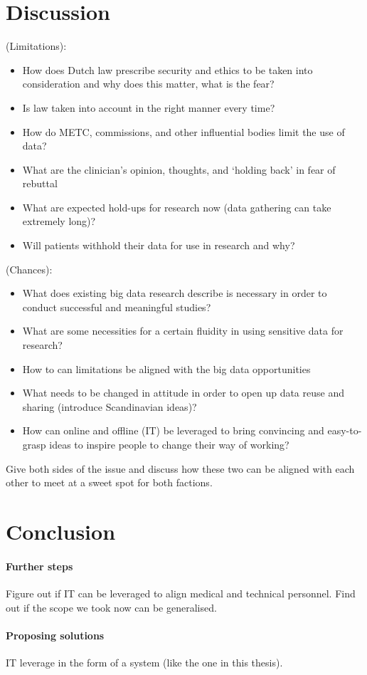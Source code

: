 \section{Discussion}
(Limitations):
\begin{itemize}
	\item How does Dutch law prescribe security and ethics to be taken into consideration and why does this matter, what is the fear?
	\item Is law taken into account in the right manner every time?
	\item How do METC, commissions, and other influential bodies limit the use of data?
	\item What are the clinician's opinion, thoughts, and `holding back' in fear of rebuttal
	\item What are expected hold-ups for research now (data gathering can take extremely long)?
	\item Will patients withhold their data for use in research and why?
\end{itemize}
(Chances):
\begin{itemize}
	\item What does existing big data research describe is necessary in order to conduct successful and meaningful studies?
	\item What are some necessities for a certain fluidity in using sensitive data for research?
	\item How to can limitations be aligned with the big data opportunities
	\item What needs to be changed in attitude in order to open up data reuse and sharing (introduce Scandinavian ideas)?
	\item How can online and offline (IT) be leveraged to bring convincing and easy-to-grasp ideas to inspire people to change their way of working?
\end{itemize}
Give both sides of the issue and discuss how these two can be aligned with each other to meet at a sweet spot for both factions.

\section{Conclusion}
\paragraph{Further steps}
Figure out if IT can be leveraged to align medical and technical personnel.
Find out if the scope we took now can be generalised.
\paragraph{Proposing solutions}
IT leverage in the form of a system (like the one in this thesis).